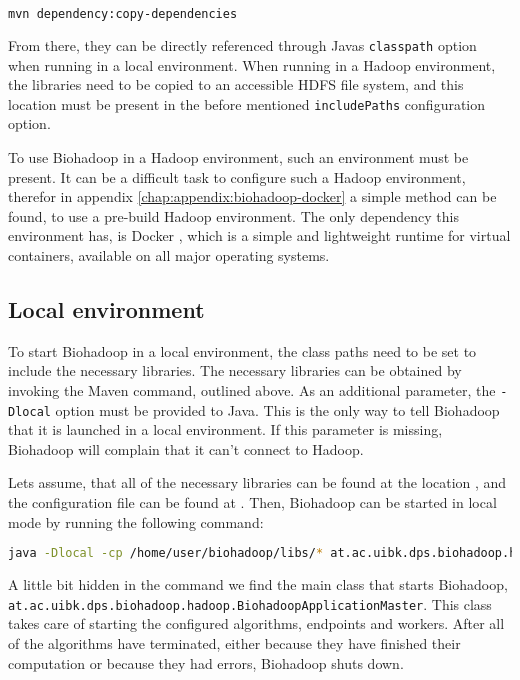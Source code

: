 \begin{lstlisting}[language=bash]
mvn dependency:copy-dependencies
\end{lstlisting}

From there, they can be directly referenced through Javas \texttt{classpath} option when running in a local environment. When running in a Hadoop environment, the libraries need to be copied to an accessible HDFS file system, and this location must be present in the before mentioned \texttt{includePaths} configuration option.

To use Biohadoop in a Hadoop environment, such an environment must be present. It can be a difficult task to configure such a Hadoop environment, therefor in appendix \ref{chap:appendix:biohadoop-docker} a simple method can be found, to use a pre-build Hadoop environment. The only dependency this environment has, is Docker \cite{docker}, which is a simple and lightweight runtime for virtual containers, available on all major operating systems.

  \subsection{Local environment}
  \label{chap:usage:local}
  To start Biohadoop in a local environment, the class paths need to be set to include the necessary libraries. The necessary libraries can be obtained by invoking the Maven command, outlined above. As an additional parameter, the \texttt{-Dlocal} option must be provided to Java. This is the only way to tell Biohadoop that it is launched in a local environment. If this parameter is missing, Biohadoop will complain that it can't connect to Hadoop.
  
  Lets assume, that all of the necessary libraries can be found at the location , and the configuration file can be found at . Then, Biohadoop can be started in local mode by running the following command:
  
  \begin{lstlisting}[language=bash]
java -Dlocal -cp /home/user/biohadoop/libs/* at.ac.uibk.dps.biohadoop.hadoop.BiohadoopApplicationMaster /home/user/biohadoop/configs/simple-config-json
  \end{lstlisting}

  A little bit hidden in the command we find the main class that starts Biohadoop, \texttt{at.ac.uibk.dps.biohadoop.hadoop.BiohadoopApplicationMaster}. This class takes care of starting the configured algorithms, endpoints and workers. After all of the algorithms have terminated, either because they have finished their computation or because they had errors, Biohadoop shuts down.
  
